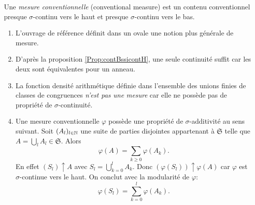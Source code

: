 \begin{defi}
Une \emph{mesure conventionnelle} (conventional measure)  est un contenu conventionnel presque $\sigma$-continu vers le haut et presque $\sigma$-continu vers le bas.
\end{defi}

\begin{rems}
 \begin{enumerate}
  \item L'ouvrage de référence définit dans un ovale une notion plus générale de mesure.
  \item D'après la proposition \ref{Prop:contBssicontH}, une seule  continuité suffit car les deux sont équivalentes pour un anneau.
  \item La fonction densité arithmétique définie dans l'ensemble des unions finies de classes de congruences \emph{n'est pas une mesure} car elle ne possède pas de propriété de $\sigma$-continuité.
  \item Une mesure conventionnelle $\varphi$ possède une propriété de $\sigma$-additivité au sens suivant.\newline
  Soit $(A_l)_{l \in \mathbb{N}}$ une suite de parties disjointes appartenant à $\mathfrak{S}$ telle que $A = \bigcup_l A_l \in \mathfrak{S}$. Alors
  \begin{displaymath}
   \varphi(A) = \sum_{k\geq 0} \varphi(A_k).
  \end{displaymath}
En effet $(S_l)\uparrow A$ avec $S_l = \bigcup_{k=0}^l A_k$. Donc $(\varphi(S_l))\uparrow \varphi (A)$ car $\varphi$ est $\sigma$-continue vers le haut. On conclut avec la modularité de $\varphi$:
\begin{displaymath}
 \varphi(S_l) = \sum_{k=0}^{l} \varphi(A_k).
\end{displaymath}
 \end{enumerate}
\end{rems}

